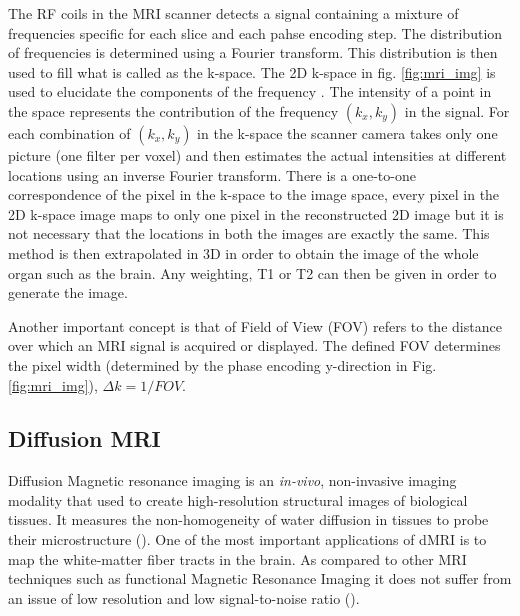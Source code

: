 \documentclass[msthesis.tex]{subfiles}
\begin{document}
The RF coils in the MRI scanner detects a signal containing a mixture of frequencies specific for each slice and each pahse encoding step. The distribution of frequencies is determined using a Fourier transform. This distribution is then used to fill what is called as the k-space. The 2D k-space in fig. \ref{fig:mri_img} is used to elucidate the components of the frequency . The intensity of a point in the space represents the contribution of the frequency $(k_x,k_y)$ in the signal. For each combination of $(k_x, k_y)$ in the k-space the scanner camera takes only one picture (one filter per voxel) and then estimates the actual intensities at different locations using an inverse Fourier transform. There is a one-to-one correspondence of the pixel in the k-space to the image space, every pixel in the 2D k-space image maps to only one pixel in the reconstructed 2D image but it is not necessary that the locations in both the images are exactly the same. This method is then extrapolated in 3D in order to obtain the image of the whole organ such as the brain. Any weighting, T1 or T2 can then be given in order to generate the image.

Another important concept is that of Field of View (FOV) refers to the distance over which an MRI signal is acquired or displayed. The defined FOV determines the pixel width (determined by the phase encoding y-direction in Fig. \ref{fig:mri_img}), $\Delta k = 1/FOV$. 



\subsection{Diffusion MRI}

Diffusion Magnetic resonance imaging is an \textit{in-vivo}, non-invasive imaging modality that used to create high-resolution structural images of biological tissues. It measures the non-homogeneity of water diffusion in tissues to probe their microstructure (\cite{ghosh2015survey}). One of the most important applications of dMRI is to map the white-matter fiber tracts in the brain. As compared to other MRI techniques such as functional Magnetic Resonance Imaging it does not suffer from an issue of low resolution and low signal-to-noise ratio (\cite{wong2016}). 
\end{document}
